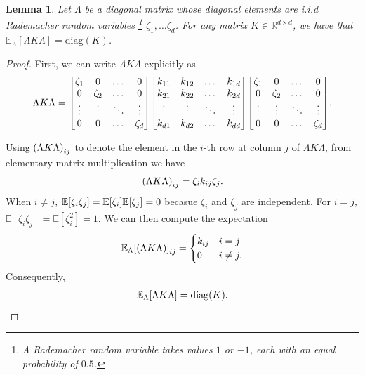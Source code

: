 \documentclass{article}
\newcommand{\R}{\mathbb{R}}
\newcommand{\E}{\mathbb{E}}
\newcommand{\diag}{\text{diag}}
\newtheorem{lemma}{Lemma}[subsection]%
\begin{document}
\begin{lemma} 
\label{lemma: rademacher diagonal}
    Let $\Lambda$ be a diagonal matrix whose diagonal elements are i.i.d Rademacher random variables  \footnote{A Rademacher random variable takes values $1$ or $-1$, each with an equal probability of $0.5$.} $\zeta_1, \dots \zeta_d$. 
    For any matrix $K \in \R^{d\times d}$, we have that $\E_\Lambda[\Lambda K \Lambda] = \diag(K)$.
\end{lemma}
\begin{proof}
     First, we can write $\Lambda K \Lambda$ explicitly as
    \begin{align}
        \Lambda K \Lambda = \mqty[\zeta_1 & 0& \dots & 0 \\
        0 & \zeta_2 & \dots & 0 \\
        \vdots & \vdots & \ddots & \vdots \\
        0 & 0& \dots & \zeta_d] 
        \mqty[k_{11} & k_{12}& \dots & k_{1d} \\
        k_{21} & k_{22}& \dots & k_{2d} \\
        \vdots & \vdots & \ddots & \vdots \\
        k_{d1} & k_{d2}& \dots & k_{dd}] 
        \mqty[\zeta_1 & 0& \dots & 0 \\
        0 & \zeta_2 & \dots & 0 \\
        \vdots & \vdots & \ddots & \vdots \\
        0 & 0& \dots & \zeta_d].
    \end{align}

    Using $\qty(\Lambda K \Lambda)_{ij}$ to denote the element in the $i$-th row at column $j$ of $\Lambda K \Lambda$, from elementary matrix multiplication we have
    \begin{align}
        \qty(\Lambda K \Lambda)_{ij} = \zeta_i k_{ij} \zeta_j.
    \end{align}
    When $i \neq j$, $\E\qty[\zeta_i \zeta_j] = \E\qty[\zeta_i]\E\qty[\zeta_j] = 0$ becasue $\zeta_i$ and $\zeta_j$ are independent. 
    For $i=j$, $\E[\zeta_i \zeta_j] = \E[\zeta_i^2] = 1$. 
    We can then compute the expectation
    \begin{align}
        \E_\Lambda \qty[\qty(\Lambda K \Lambda)]_{ij} =
        \begin{cases}
            k_{ij} &  i=j \\
            0 & i\neq j.
        \end{cases}
    \end{align}
Consequently,
\begin{align}
    \E_\Lambda \qty[\Lambda K \Lambda] = \diag(K).
\end{align}
\end{proof}
\end{document}
